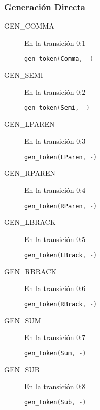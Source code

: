 \documentclass[a4paper]{CSMakotoTechnicalReport}
\begin{document}
    \subsubsection{Generación Directa}

    \begin{multicols}{2}

    \begin{description}
        \item[GEN\_COMMA] En la transición $0$:$1$
            \begin{lstlisting}[language=C]
 gen_token(Comma, -)
            \end{lstlisting}

        \item[GEN\_SEMI] En la transición $0$:$2$
            \begin{lstlisting}[language=C]
 gen_token(Semi, -)
            \end{lstlisting}

        \item[GEN\_LPAREN] En la transición $0$:$3$
            \begin{lstlisting}[language=C]
 gen_token(LParen, -)
            \end{lstlisting}

        \item[GEN\_RPAREN] En la transición $0$:$4$
            \begin{lstlisting}[language=C]
 gen_token(RParen, -)
            \end{lstlisting}

        \item[GEN\_LBRACK] En la transición $0$:$5$
            \begin{lstlisting}[language=C]
 gen_token(LBrack, -)
            \end{lstlisting}

        \item[GEN\_RBRACK] En la transición $0$:$6$
            \begin{lstlisting}[language=C]
 gen_token(RBrack, -)
            \end{lstlisting}

        \item[GEN\_SUM] En la transición $0$:$7$
            \begin{lstlisting}[language=C]
 gen_token(Sum, -)
            \end{lstlisting}

        \item[GEN\_SUB] En la transición $0$:$8$
            \begin{lstlisting}[language=C]
 gen_token(Sub, -)
            \end{lstlisting}


\end{description}
\end{multicols}
\end{document}
